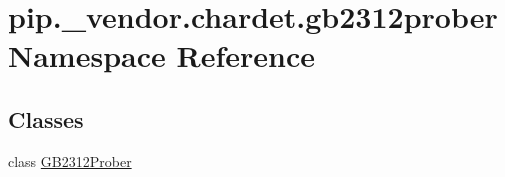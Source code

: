 \hypertarget{namespacepip_1_1__vendor_1_1chardet_1_1gb2312prober}{}\section{pip.\+\_\+vendor.\+chardet.\+gb2312prober Namespace Reference}
\label{namespacepip_1_1__vendor_1_1chardet_1_1gb2312prober}
\subsection*{Classes}
\begin{DoxyCompactItemize}
\item 
class \hyperlink{classpip_1_1__vendor_1_1chardet_1_1gb2312prober_1_1GB2312Prober}{G\+B2312\+Prober}
\end{DoxyCompactItemize}
